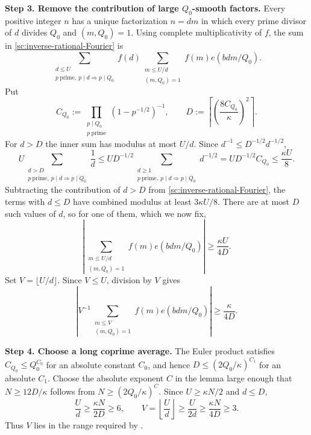 \documentclass[twoside]{aomart}
\makeatletter
\theoremstyle{paperplain}
\theoremstyle{paperdefinition}
\renewenvironment{proof}[1][\proofname]{\par\pushQED{\qed}%
  \normalfont\topsep6\p@\@plus3\p@\relax\trivlist
  \item[\hskip\labelsep\itshape #1\@addpunct{.}]\ignorespaces
}{\popQED\endtrivlist\@endpefalse}
\numberwithin{equation}{section}
\makeatother
\begin{document}
\begin{proof}
\par
\medskip
\noindent\textbf{Step 3. Remove the contribution of large $Q_0$-smooth factors.}
Every positive integer $n$ has a unique factorization $n=dm$ in
which every prime divisor of $d$ divides $Q_0$ and $(m,Q_0)=1$.
Using complete multiplicativity of $f$, the sum in
\eqref{sc:inverse-rational-Fourier} is
\begin{equation*}
 \sum_{\substack{d\le U\\p\ \mathrm{prime},\ p\mid d\Rightarrow p\mid Q_0}}
     f(d)\sum_{\substack{m\le U/d\\(m,Q_0)=1}}
                      f(m)e(bdm/Q_0).
\end{equation*}
Put
\[
 C_{Q_0}:=\prod_{\substack{p\mid Q_0\\p\ \mathrm{prime}}}(1-p^{-1/2})^{-1},
 \qquad
 D:=\left\lceil\left(\frac{8C_{Q_0}}{\kappa}\right)^2\right\rceil.
\]
For $d>D$ the inner sum has modulus at most $U/d$. Since
$d^{-1}\le D^{-1/2}d^{-1/2}$,
\begin{equation*}
 U\sum_{\substack{d>D\\p\ \mathrm{prime},\ p\mid d\Rightarrow p\mid Q_0}}\frac1d
 \le UD^{-1/2}
 \sum_{\substack{d\ge1\\p\ \mathrm{prime},\ p\mid d\Rightarrow p\mid Q_0}}d^{-1/2}
 =UD^{-1/2}C_{Q_0}
 \le\frac{\kappa U}{8}.
\end{equation*}
Subtracting the contribution of $d>D$ from
\eqref{sc:inverse-rational-Fourier}, the terms with $d\le D$ have
combined modulus at least $3\kappa U/8$.
There are at most $D$ such values of $d$, so for one of them,
which we now fix,
\begin{equation*}
 \left|\sum_{\substack{m\le U/d\\(m,Q_0)=1}}
                      f(m)e(bdm/Q_0)\right|
 \ge\frac{\kappa U}{4D}.
\end{equation*}
Set $V=\lfloor U/d\rfloor$. Since $V\le U$, division by $V$ gives
\begin{equation*}
 \left|V^{-1}\sum_{\substack{m\le V\\(m,Q_0)=1}}
                      f(m)e(bdm/Q_0)\right|
 \ge\frac{\kappa}{4D}.
 \end{equation*}

\par
\medskip
\noindent\textbf{Step 4. Choose a long coprime average.}
The Euler product satisfies $C_{Q_0}\le Q_0^{C_0}$ for an absolute
constant $C_0$, and hence
$D\le(2Q_0/\kappa)^{C_1}$ for an absolute $C_1$.
Choose the absolute exponent $C$ in the lemma large enough that
$N\ge12D/\kappa$ follows from
$N\ge(2Q_0/\kappa)^C$. Since $U\ge\kappa N/2$ and $d\le D$,
\begin{equation*}
 \frac Ud\ge\frac{\kappa N}{2D}\ge6,
 \qquad
 V=\left\lfloor\frac Ud\right\rfloor
 \ge\frac{U}{2d}
 \ge\frac{\kappa N}{4D}\ge3.
\end{equation*}
Thus $V$ lies in the range required by .


\end{proof}
\end{document}
